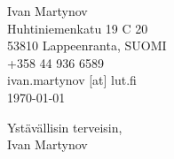 \documentclass[]{article}
\begin{document}
\begin{flushright}
	Ivan Martynov\\
  Huhtiniemenkatu 19 C 20\\
	53810 Lappeenranta, SUOMI\\
	+358 44 936 6589\\
	ivan.martynov [at] lut.fi\\
	\today
\end{flushright}

\noindent
\bigskip

\noindent


\noindent

\noindent
Yst\"av\"allisin terveisin,\\
Ivan Martynov
\end{document}
